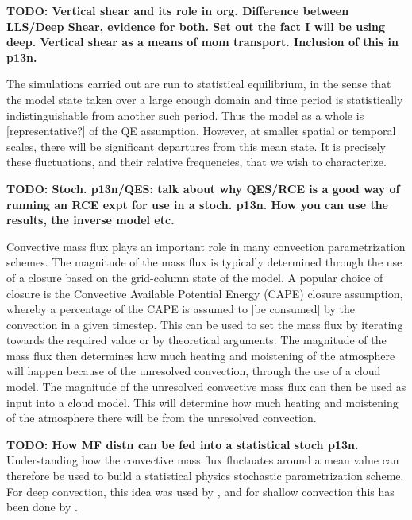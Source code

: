 \documentclass[11pt,a4paper]{article}
\newcommand\todo[1]{\textbf{TODO: #1}}
\begin{document}
\todo{Vertical shear and its role in org. Difference between LLS/Deep Shear, evidence for both. Set out the fact I will be using deep. Vertical shear as a means of mom transport. Inclusion of this in p13n.}

The simulations carried out are run to statistical equilibrium, in the sense that the model state taken over a large enough domain and time period is statistically indistinguishable from another such period. Thus the model as a whole is [representative?] of the QE assumption. However, at smaller spatial or temporal scales, there will be significant departures from this mean state. It is precisely these fluctuations, and their relative frequencies, that we wish to characterize.

\todo{Stoch. p13n/QES: talk about why QES/RCE is a good way of running an RCE expt for use in a stoch. p13n. How you can use the results, the inverse model etc.}

Convective mass flux plays an important role in many convection parametrization schemes. The magnitude of the mass flux is typically determined through the use of a closure based on the grid-column state of the model. A popular choice of closure is the Convective Available Potential Energy (CAPE) closure assumption, whereby a percentage of the CAPE is assumed to [be consumed] by the convection in a given timestep. This can be used to set the mass flux by iterating towards the required value or by theoretical arguments. The magnitude of the mass flux then determines how much heating and moistening of the atmosphere will happen because of the unresolved convection, through the use of a cloud model.
The magnitude of the unresolved convective mass flux can then be used as input into a cloud model. This will determine how much heating and moistening of the atmosphere there will be from the unresolved convection.


\todo{How MF distn can be fed into a statistical stoch p13n.}
Understanding how the convective mass flux fluctuates around a mean value can therefore be used to build a statistical physics stochastic parametrization scheme. For deep convection, this idea was used by \cite{PC2008}, and for shallow convection this has been done by \cite{sakradzija2016stochastic}. 

\end{document}
